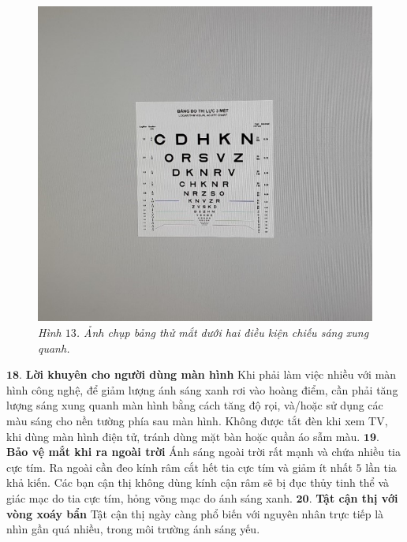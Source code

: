 \begin{multicols}{2}
\begin{figure}[H]
		\vspace*{2pt}
		\includegraphics[width= 1\linewidth]{13b}
		\caption{\small\textit{\color{timhieukhoahoc}Hình $13$. Ảnh chụp bảng thử mắt dưới hai điều kiện chiếu sáng xung quanh.}}
		\vspace*{-10pt}
	\end{figure}
	$\pmb{18.}$ \textbf{\color{timhieukhoahoc}Lời khuyên cho người dùng màn hình} 
	\vskip 0.1cm
	Khi phải làm việc nhiều với màn hình công nghệ, để giảm lượng ánh sáng xanh rơi vào hoàng điểm, cần phải tăng lượng sáng xung quanh màn hình bằng cách tăng độ rọi, và/hoặc sử dụng các màu sáng cho nền tường phía sau màn hình.
	\vskip 0.1cm
	Không được tắt đèn khi xem TV, khi dùng màn hình điện tử, tránh dùng mặt bàn hoặc quần áo sẫm màu.
	\vskip 0.1cm
	\columnbreak
	$\pmb{19.}$ \textbf{\color{timhieukhoahoc}Bảo vệ mắt khi ra ngoài trời}
	\vskip 0.1cm
	Ánh sáng ngoài trời rất mạnh và chứa nhiều tia cực tím. Ra ngoài cần đeo kính râm cắt hết tia cực tím và giảm ít nhất $5$ lần tia khả kiến. Các bạn cận thị không dùng kính cận râm sẽ bị đục thủy tinh thể và giác mạc do tia cực tím, hỏng võng mạc do ánh sáng xanh. 
	\vskip 0.1cm
	$\pmb{20.}$ \textbf{\color{timhieukhoahoc}Tật cận thị với vòng xoáy bẩn}
	\vskip 0.1cm
	Tật cận thị ngày càng phổ biến với nguyên nhân trực tiếp là nhìn gần quá nhiều, trong môi trường ánh sáng yếu.
	\begin{figure}[H]
		\vspace*{-5pt}

\end{figure}
\end{multicols}
